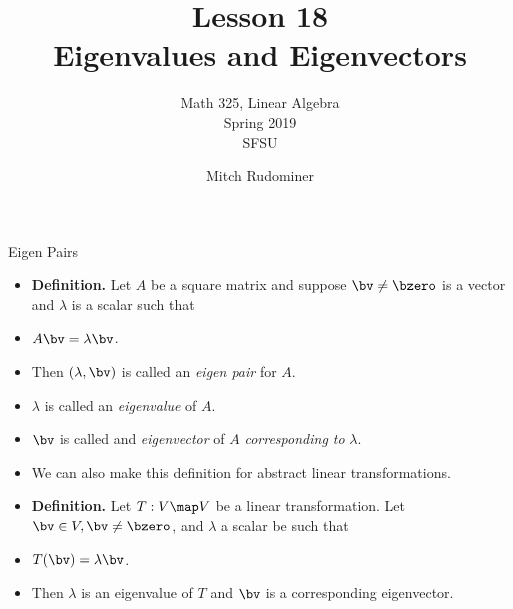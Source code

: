 \documentclass{beamer}
\title{Lesson 18 \\ Eigenvalues and Eigenvectors}
\subtitle{Math 325, Linear Algebra \\ Spring 2019 \\ SFSU}
\author{Mitch Rudominer}
\date{}
\begin{document}
\begin{frame}
  \titlepage
\end{frame}


\begin{frame}{Eigen Pairs}

\begin{itemize}
\item \textbf{Definition.} Let $A$ be a square matrix and suppose $\bv\not=\bzero$ is a vector and $\lambda$ is a scalar such that
\item $A\bv=\lambda\bv$.
\item Then $\left(\lambda, \bv \right)$ is called an \emph{eigen pair} for $A$.
\item $\lambda$ is called an \emph{eigenvalue} of $A$.
\item $\bv$ is called and \emph{eigenvector} of $A$ \emph{corresponding to} $\lambda$.
\item We can also make this definition for abstract linear transformations.
\item \textbf{Definition.} Let $T:V\map V$ be a linear transformation. Let $\bv\in V, \bv\not=\bzero$, and $\lambda$ a scalar be such that
\item $T(\bv)=\lambda\bv$.
\item Then $\lambda$ is an eigenvalue of $T$  and $\bv$ is a corresponding eigenvector.
\end{itemize}
\end{frame}

\end{document}
